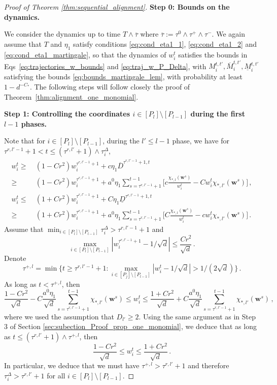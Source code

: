 \documentclass[11pt]{article}
\newcommand{\<}{\langle}
\renewcommand{\>}{\rangle}
\theoremstyle{definition}
\def\bw{{\boldsymbol w}}
\def\bw{{\boldsymbol w}}
\def\uD{\underline{D}}
\def\uM{\underline{M}}
\def\oD{\overline{D}}
\def\oM{\overline{M}}
\def\otau{\overline{\tau}}
\def\oD{\overline{D}}
\begin{document}
\begin{proof}[Proof of Theorem \ref{thm:sequential_alignment}]
\textbf{Step 0: Bounds on the dynamics.}

We consider the dynamics up to time $T \wedge \otau$ where $\otau := \tau^0 \wedge \tau^+ \wedge \tau^-$. We again assume that $T$ and $\eta_1$ satisfy conditions \eqref{eq:cond_eta1_1}, \eqref{eq:cond_eta1_2} and \eqref{eq:cond_eta1_martingale}, so that the dynamics of $w_i^t$ satisfies the bounds in Eqs~\eqref{eq:trajectories_w_bounds} and \eqref{eq:traj_w_P_Delta}, with $M_i^{t,t'}, \oM_i^{t,t'}, \uM_i^{t,t'}$ satisfying the bounds \eqref{eq:bounds_martingale_lem}, with probability at least $1 - d^{-C_*}$. The following steps will follow closely the proof of Theorem~\ref{thm:alignment_one_monomial}.

\noindent
\textbf{Step 1: Controlling the coordinates $i\in[P_l]\setminus [P_{l-1}]$ during the first $l-1$ phases.}

Note that for $i\in [P_l] \setminus [P_{l-1}]$, during the $l' \leq l-1$ phase, we have for $\tau^{r,l'-1}+1 < t \leq (\tau^{r,l'} +1)\wedge \tau^{\Delta}_i$,
\begin{equation}\label{eq:coordinates_previous_phases}
\begin{aligned}
w_i^t \geq&~ (1 -Cr^2) w^{\tau^{r,l'-1}+1}_i + c \eta_1 \oD^{\tau^{r,l'-1}+1, t} \\
\geq&~ (1 -Cr^2) w^{\tau^{r,l'-1}+1}_i + a^0 \eta_1 \sum_{s = \tau^{r,l'-1}+1}^{t-1} \Big[c \frac{\chi_{*,l} (\bw^s)}{w_i^t} - C w_i^t \chi_{*,l'} (\bw^s)  \Big] \, , \\
w_i^t \leq &~ (1 + Cr^2) w^{\tau^{r,l'-1}+1}_i + C \eta_1 \uD^{\tau^{r,l'-1}+1, t} \\
\geq &~ (1 +Cr^2) w^{\tau^{r,l'-1}+1}_i + a^0 \eta_1 \sum_{s = \tau^{r,l'-1}+1}^{t-1} \Big[C \frac{\chi_{*,l} (\bw^s)}{w_i^t} - c w_i^t \chi_{*,l'} (\bw^s)  \Big] \, .
 \end{aligned}
\end{equation}
Assume that $\min_{i \in [P_l] \setminus [P_{l-1}]} \tau_i^\Delta > \tau^{r,l'-1}+1$ and
\[
\max_{i \in [P_l] \setminus [P_{l-1}]} | w^{\tau^{r,l'-1}+1}_i - 1/\sqrt{d} | \leq \frac{Cr^2}{\sqrt{d} } \, .
\]
Denote 
\[
\tau^{+,l} = \min \{ t \geq \tau^{r,l'-1}+1 : \max_{i \in [P_j] \setminus [P_{l-1}]} |w_i^t - 1/\sqrt{d} | > 1/(2 \sqrt{d} ) \}  \, .
\]
As long as $t < \tau^{+,l}$, then
\[
\frac{1 - Cr^2}{\sqrt{d}} - C\frac{a^0 \eta_1}{\sqrt{d}} \sum_{s = \tau^{r,l'-1}+1}^{t-1} \chi_{*,l'} (\bw^s) \leq w_i^t \leq \frac{1 + Cr^2}{\sqrt{d}} +C \frac{a^0 \eta_1}{\sqrt{d}} \sum_{s = \tau^{r,l'-1}+1}^{t-1} \chi_{*,l'} (\bw^s) \, ,
\]
where we used the assumption that $D_{l'} \geq 2$.
Using the same argument as in Step 3 of Section \ref{sec:subection_Proof_prop_one_monomial}, we deduce that as long as $t \leq (\tau^{r,l'} +1) \wedge \tau^{+,l}$, then 
\[
\frac{1 - Cr^2}{\sqrt{d}}  \leq w_i^t \leq \frac{1 + Cr^2}{\sqrt{d}}\, .
\]
In particular, we deduce that we must have $\tau^{+,l} > \tau^{r,l'} +1$ and therefore $\tau^{\Delta}_i > \tau^{r,l'} +1$ for all $i \in [P_l] \setminus [P_{l-1}]$.


\end{proof}
\end{document}

